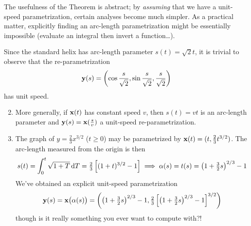The usefulness of the Theorem is abstract; by \emph{assuming} that we have a unit-speed parametrization, certain analyses become much simpler. As a practical matter, explicitly finding an arc-length parametrization might be essentially impossible (evaluate an integral then invert a function\ldots).

\begin{examples}{}{}
\exstart Since the standard helix has arc-length parameter $s(t)=\sqrt 2t$, it is trivial to observe that the re-parametrization
\[{\mathbf{y}}(s)=\left(\cos\frac s{\sqrt 2},\sin\frac s{\sqrt 2},\frac s{\sqrt 2}\right) \]
has unit speed.
\begin{enumerate}\setcounter{enumi}{1}
  \item More generally, if ${\mathbf{x}}(t)$ has constant speed $v$, then $s(t)=vt$ is an arc-length parameter and ${\mathbf{y}}(s)={\mathbf{x}}(\tfrac sv)$ a unit-speed re-parametrization.
  \item The graph of $y=\frac 23x^{3/2}$ ($t\ge 0$) may be parametrized by ${\mathbf{x}}(t)=(t,\frac 23t^{3/2})$. The arc-length measured from the origin is then
  \[s(t)=\int_0^t\sqrt{1+T}\,\mathrm{d} T =\tfrac 23\left[(1+t)^{3/2}-1\right] \implies \alpha(s)=t(s)=\left(1+\tfrac 32s\right)^{2/3}-1\]
  We've obtained an explicit unit-speed parametrization
  \[{\mathbf{y}}(s)={\mathbf{x}}\bigl(\alpha(s)\bigr) =\left(\left(1+\tfrac 32s\right)^{2/3}-1,\tfrac 23\left[\left(1+\tfrac 32s\right)^{2/3}-1\right]^{3/2}\right) \]
  though is it really something you ever want to compute with?!

	\goodbreak
	

\end{enumerate}
\end{examples}

